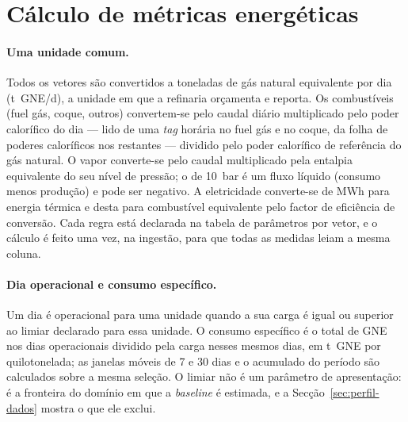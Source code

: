 \section{Cálculo de métricas energéticas}
\label{sec:metricas}

\paragraph{Uma unidade comum.} Todos os vetores são convertidos a
toneladas de gás natural equivalente por dia (t~GNE/d), a unidade em que
a refinaria orçamenta e reporta. Os combustíveis (fuel gás, coque, outros)
convertem-se pelo caudal diário multiplicado pelo poder calorífico do dia
--- lido de uma \emph{tag} horária no fuel gás e no coque, da folha de
poderes caloríficos nos restantes --- dividido pelo poder calorífico de
referência do gás natural. O vapor converte-se pelo caudal multiplicado
pela entalpia equivalente do seu nível de pressão; o de 10~bar é um fluxo
líquido (consumo menos produção) e pode ser negativo. A eletricidade
converte-se de MWh para energia térmica e desta para combustível
equivalente pelo factor de eficiência de conversão. Cada regra está
declarada na tabela de parâmetros por vetor, e o cálculo é feito uma vez,
na ingestão, para que todas as medidas leiam a mesma coluna.

\paragraph{Dia operacional e consumo específico.} Um dia é operacional
para uma unidade quando a sua carga é igual ou superior ao limiar declarado
para essa unidade. O consumo específico é o total de GNE nos dias
operacionais dividido pela carga nesses mesmos dias, em t~GNE por
quilotonelada; as janelas móveis de 7 e 30 dias e o acumulado do período
são calculados sobre a mesma seleção. O limiar não é um parâmetro de
apresentação: é a fronteira do domínio em que a \emph{baseline} é estimada,
e a Secção~\ref{sec:perfil-dados} mostra o que ele exclui.

